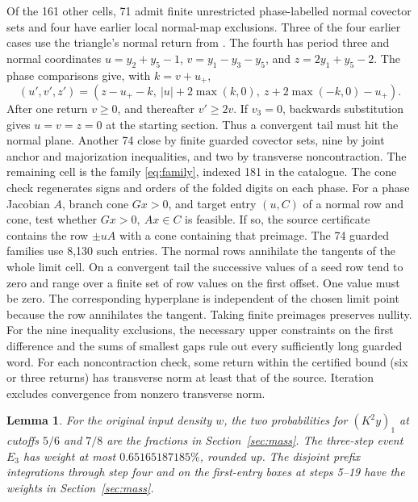 \documentclass[11pt,reqno]{amsart}
\newtheorem{lemma}[theorem]{Lemma}
\theoremstyle{definition}
\begin{document}
Of the 161 other cells, 71 admit finite unrestricted phase-labelled
normal covector sets and four have earlier local normal-map
exclusions. Three of the four earlier cases use the triangle's
normal return from \cite[Section~3]{G6}. The fourth has period
three and normal coordinates \(u=y_2+y_5-1\),
\(v=y_1-y_3-y_5\), and \(z=2y_1+y_5-2\).
The phase comparisons give, with \(k=v+u_+\),
\[
 (u',v',z')=(z-u_+-k,\ |u|+2\max(k,0),\ z+2\max(-k,0)-u_+).
\]
After one return \(v\ge0\), and thereafter \(v'\ge2v\).
If \(v_3=0\), backwards substitution gives \(u=v=z=0\)
at the starting section. Thus a convergent tail must hit the
normal plane. Another 74 close by finite guarded covector sets,
nine by joint anchor and majorization inequalities, and two by
transverse noncontraction. The remaining cell is the family
\eqref{eq:family}, indexed 181 in the catalogue. The cone check
regenerates signs and orders of the folded digits on each phase.
For a phase Jacobian \(A\), branch cone \(Gx>0\), and target entry
\((u,C)\) of a normal row and cone, test whether
\(Gx>0,\ Ax\in C\) is feasible. If so, the source certificate
contains the row \(\pm uA\) with a cone containing that preimage.
The 74 guarded families use 8,130 such entries. The normal
rows annihilate the tangents of the whole limit cell. On a
convergent tail the successive values of a seed row tend to zero
and range over a finite set of row values on the first offset.
One value must be zero. The corresponding hyperplane is
independent of the chosen limit point because the row annihilates
the tangent. Taking finite preimages preserves nullity. For
the nine inequality exclusions, the necessary upper constraints
on the first difference and the sums of smallest gaps rule out
every sufficiently long guarded word. For each noncontraction
check, some return within the certified bound (six or three
returns) has transverse norm at least that of the source.
Iteration excludes convergence from nonzero transverse norm.

\begin{lemma}\label{lem:integrals}
For the original input density \(w\), the two probabilities for
\((K^2y)_1\) at cutoffs \(5/6\) and \(7/8\) are the fractions in
Section~\ref{sec:mass}. The three-step event \(E_3\) has weight
at most \(0.65165187185\%\), rounded up. The disjoint prefix
integrations through step four and on the first-entry boxes at
steps 5--19 have the weights in Section~\ref{sec:mass}.
\end{lemma}
\end{document}
